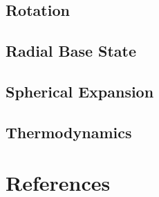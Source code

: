 \documentclass[11pt]{book}
\begin{document}
\chapter{Rotation}


\chapter{Radial Base State}


\chapter{Spherical Expansion}


\chapter{Thermodynamics}


\backmatter

\part{References}

\renewcommand\bibname{References}


\end{document}
